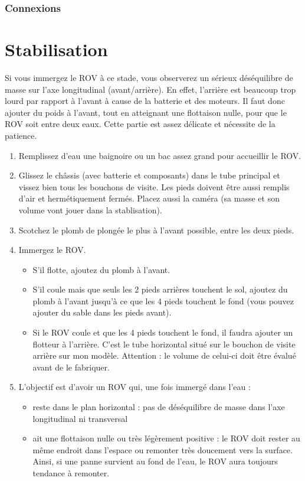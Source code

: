 \documentclass[11pt,a4paper]{article}
\begin{document}
        \subsubsection{Connexions}
          
      
      

    \section{Stabilisation}
      
      Si vous immergez le ROV à ce stade, vous observerez un sérieux déséquilibre de masse sur l'axe longitudinal (avant/arrière). En effet, l'arrière est  beaucoup trop lourd par rapport à l'avant à cause de la batterie et des moteurs. Il faut donc ajouter du poids à l'avant, tout en atteignant une flottaison nulle, pour que le ROV soit entre deux eaux. Cette partie est assez délicate et nécessite de la patience.
      \begin{enumerate}
        \item Remplissez d'eau une baignoire ou un bac assez grand pour accueillir le ROV.
        \item Glissez le châssis (avec batterie et composants) dans le tube principal et vissez bien tous les bouchons de visite. Les pieds doivent être aussi remplis d'air et hermétiquement fermés. Placez aussi la caméra (sa masse et son volume vont jouer dans la stablisation).
        \item Scotchez le plomb de plongée le plus à l'avant possible, entre les deux pieds.
        \item Immergez le ROV. 
        \begin{itemize}
          \item S'il flotte, ajoutez du plomb à l'avant.
          \item S'il coule mais que seuls les 2 pieds arrières touchent le sol, ajoutez du plomb à l'avant jusqu'à ce que les 4 pieds touchent le fond (vous pouvez ajouter du sable dans les pieds avant).
          \item Si le ROV coule et que les 4 pieds touchent le fond, il faudra ajouter un flotteur à l'arrière. C'est le tube horizontal situé sur le bouchon de visite arrière sur mon modèle. Attention : le volume de celui-ci doit être évalué avant de le fabriquer.
        \end{itemize}
        \item L'objectif est d'avoir un ROV qui, une fois immergé dans l'eau :
        \begin{itemize}
          \item reste dans le plan horizontal : pas de déséquilibre de masse dans l'axe longitudinal ni transversal
          \item ait une flottaison nulle ou très légèrement positive : le ROV doit rester au même endroit dans l'espace ou remonter très doucement vers la surface. Ainsi, si une panne survient au fond de l'eau, le ROV aura toujours tendance à remonter.
        \end{itemize}
      \end{enumerate}
\end{document}
